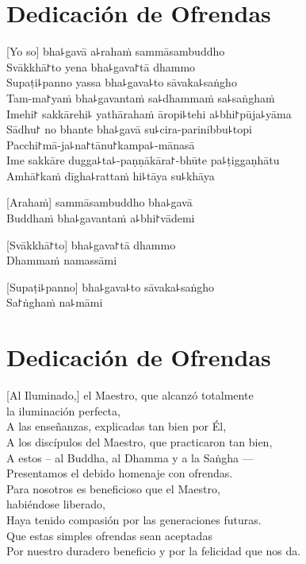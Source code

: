 \chapter*{Dedicación de Ofrendas}

\delegateSetUseNext

[Yo so] bha꜕gavā a꜕rahaṁ sammāsambuddho\\
Svākkhā꜓to yena bha꜕gava꜓tā dhammo\\
Supaṭi꜕panno yassa bha꜕gava꜕to sāvaka꜕saṅgho\\
Tam-ma꜓yaṁ bha꜕gavantaṁ sa꜕dhammaṁ sa꜕saṅghaṁ\\
Imehi꜓ sakkārehi꜕ yathārahaṁ āropi꜕tehi a꜕bhi꜓pūja꜕yāma\\
Sādhu꜓ no bhante bha꜕gavā su꜕cira-parinibbu꜕topi\\
Pacchi꜓mā-ja꜕na꜓tānu꜓kampa꜕-mānasā\\
Ime sakkāre dugga꜕ta꜕-paṇṇākāra꜓-bhūte pa꜕ṭiggaṇhātu\\
Amhā꜓kaṁ dīgha꜕rattaṁ hi꜕tāya su꜕khāya

[Arahaṁ] sammāsambuddho bha꜕gavā\\
Buddhaṁ bha꜕gavantaṁ a꜕bhi꜓vādemi 

[Svākkhā꜓to] bha꜕gava꜓tā dhammo\\
Dhammaṁ namassāmi 

[Supaṭi꜕panno] bha꜕gava꜕to sāvaka꜕saṅgho\\
Sa꜓ṅghaṁ na꜕māmi 

\clearpage

\chapter{Dedicación de Ofrendas}

[Al Iluminado,] el Maestro, que alcanzó totalmente\\
\vin la iluminación perfecta,\\
A las enseñanzas, explicadas tan bien por Él,\\
A los discípulos del Maestro, que practicaron tan bien,\\
A estos – al Buddha, al Dhamma y a la Saṅgha ---\\
Presentamos el debido homenaje con ofrendas.\\
Para nosotros es beneficioso que el Maestro,\\
\vin habiéndose liberado,\\
Haya tenido compasión por las generaciones futuras.\\
Que estas simples ofrendas sean aceptadas\\
Por nuestro duradero beneficio y por la felicidad que nos da.

